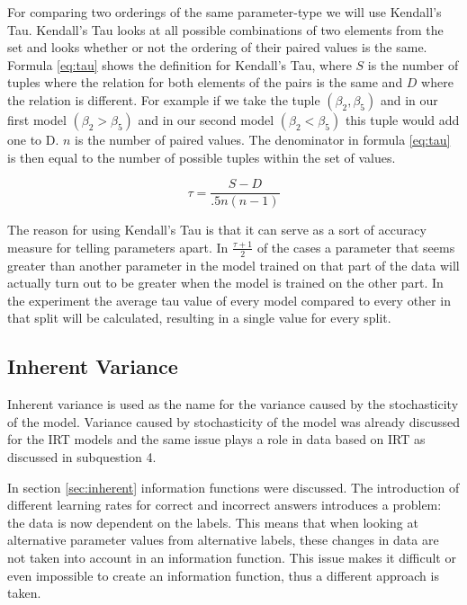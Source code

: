 \documentclass{scrartcl}
\begin{document}
For comparing two orderings of the same parameter-type we will use Kendall's Tau. Kendall's Tau looks at all possible combinations of two elements from the set and looks whether or not the ordering of their paired values is the same. Formula \ref{eq:tau} shows the definition for Kendall's Tau, where $S$ is the number of tuples where the relation for both elements of the pairs is the same and $D$ where the relation is different. For example if we take the tuple $(\beta_{2},\beta_{5})$ and in our first model $(\beta_{2}>\beta_{5})$ and in our second model $(\beta_{2}<\beta_{5})$ this tuple would add one to D. $n$ is the number of paired values. The denominator in formula \ref{eq:tau} is then equal to the number of possible tuples within the set of values.
  
\begin{equation}
\label{eq:tau}
\tau=\frac{S-D}{.5 n (n-1)}
\end{equation}

The reason for using Kendall's Tau is that it can serve as a sort of accuracy measure for telling parameters apart. In $\frac{\tau+1}{2}$ of the cases a parameter that seems greater than another parameter in the model trained on that part of the data will actually turn out to be greater when the model is trained on the other part. In the experiment the average tau value of every model compared to every other in that split will be calculated, resulting in a single value for every split.

\subsection{Inherent Variance}
Inherent variance is used as the name for the variance caused by the stochasticity of the model. Variance caused by stochasticity of the model was already discussed for the IRT models and the same issue plays a role in data based on IRT as discussed in subquestion 4.

In section \ref{sec:inherent} information functions were discussed. The introduction of different learning rates for correct and incorrect answers introduces a problem: the data is now dependent on the labels. This means that when looking at alternative parameter values from alternative labels, these changes in data are not taken into account in an information function. This issue makes it difficult or even impossible to create an information function, thus a different approach is taken.
\end{document}
